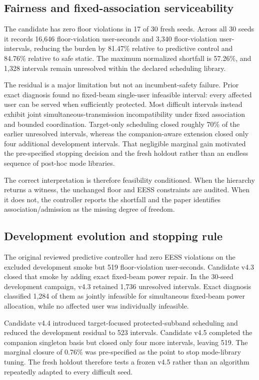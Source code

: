 \documentclass[journal]{IEEEtran}
\begin{document}
\subsection{Fairness and fixed-association serviceability}
The candidate has zero floor violations in 17 of 30 fresh seeds. Across all 30 seeds it records 16,646 floor-violation user-seconds and 3,340 floor-violation user-intervals, reducing the burden by 81.47\% relative to predictive control and 84.76\% relative to safe static. The maximum normalized shortfall is 57.26\%, and 1,328 intervals remain unresolved within the declared scheduling library.

The residual is a major limitation but not an incumbent-safety failure. Prior exact diagnosis found no fixed-beam single-user infeasible interval: every affected user can be served when sufficiently protected. Most difficult intervals instead exhibit joint simultaneous-transmission incompatibility under fixed association and bounded coordination. Target-only scheduling closed roughly 70\% of the earlier unresolved intervals, whereas the companion-aware extension closed only four additional development intervals. That negligible marginal gain motivated the pre-specified stopping decision and the fresh holdout rather than an endless sequence of post-hoc mode libraries.

The correct interpretation is therefore feasibility conditioned. When the hierarchy returns a witness, the unchanged floor and EESS constraints are audited. When it does not, the controller reports the shortfall and the paper identifies association/admission as the missing degree of freedom.


\subsection{Development evolution and stopping rule}

The original reviewed predictive controller had zero EESS violations on the excluded development smoke but 519 floor-violation user-seconds. Candidate v4.3 closed that smoke by adding exact fixed-beam power repair. In the 30-seed development campaign, v4.3 retained 1,736 unresolved intervals. Exact diagnosis classified 1,284 of them as jointly infeasible for simultaneous fixed-beam power allocation, while no affected user was individually infeasible.

Candidate v4.4 introduced target-focused protected-subband scheduling and reduced the development residual to 523 intervals. Candidate v4.5 completed the companion singleton basis but closed only four more intervals, leaving 519. The marginal closure of 0.76\% was pre-specified as the point to stop mode-library tuning. The fresh holdout therefore tests a frozen v4.5 rather than an algorithm repeatedly adapted to every difficult seed.
\end{document}
